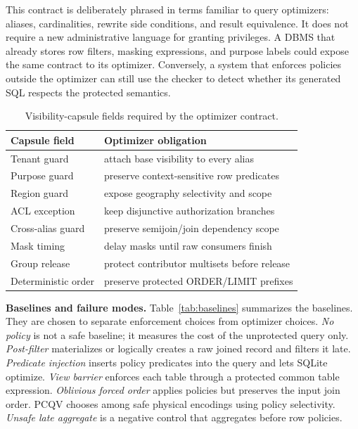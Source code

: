 \documentclass[conference]{IEEEtran}
\newcommand{\pcqv}{PCQV}
\begin{document}
This contract is deliberately phrased in terms familiar to query optimizers: aliases, cardinalities, rewrite side conditions, and result equivalence. It does not require a new administrative language for granting privileges. A DBMS that already stores row filters, masking expressions, and purpose labels could expose the same contract to its optimizer. Conversely, a system that enforces policies outside the optimizer can still use the checker to detect whether its generated SQL respects the protected semantics.

\begin{table}[t]
\centering
\caption{Visibility-capsule fields required by the optimizer contract.}
\label{tab:contract}
\begin{tabular}{p{}p{}}
\toprule
Capsule field & Optimizer obligation \\
\midrule
Tenant guard & attach base visibility to every alias \\
Purpose guard & preserve context-sensitive row predicates \\
Region guard & expose geography selectivity and scope \\
ACL exception & keep disjunctive authorization branches \\
Cross-alias guard & preserve semijoin/join dependency scope \\
Mask timing & delay masks until raw consumers finish \\
Group release & protect contributor multisets before release \\
Deterministic order & preserve protected ORDER/LIMIT prefixes \\
\bottomrule
\end{tabular}
\end{table}

\noindent\textbf{Baselines and failure modes.}
Table~\ref{tab:baselines} summarizes the baselines. They are chosen to separate enforcement choices from optimizer choices. \textit{No policy} is not a safe baseline; it measures the cost of the unprotected query only. \textit{Post-filter} materializes or logically creates a raw joined record and filters it late. \textit{Predicate injection} inserts policy predicates into the query and lets SQLite optimize. \textit{View barrier} enforces each table through a protected common table expression. \textit{Oblivious forced order} applies policies but preserves the input join order. \pcqv{} chooses among safe physical encodings using policy selectivity. \textit{Unsafe late aggregate} is a negative control that aggregates before row policies.
\end{document}
